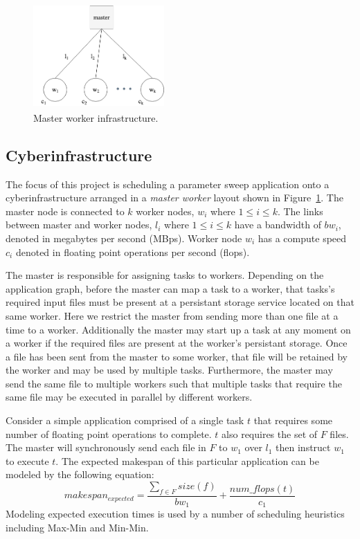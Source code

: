 \begin{figure}[H]
  \centering
  \includegraphics[width=50mm, height=40mm]{figures/platform.png}
  \caption{Master worker infrastructure.}
  \label{fig:platform}
\end{figure}

\subsection*{Cyberinfrastructure}

The focus of this project is scheduling a parameter sweep application onto a
cyberinfrastructure arranged in a \textit{master worker} layout shown in Figure~\ref{fig:platform}. The
master node is connected to $k$ worker nodes, $w_i$ where $1 \leq i \leq k$.
The links between master and worker nodes, $l_i$ where $1 \leq i \leq k$ have
a bandwidth of $bw_i$, denoted in megabytes per second (MBps).
Worker node $w_i$ has a compute speed $c_i$ denoted in floating point operations
per second (flops).

The master is responsible for assigning tasks to workers. Depending
on the application graph, before the master can map a task to a worker,
that tasks's required input files must be present at a persistant storage
service located on that same worker. Here we restrict the master from
sending more than one file at a time to a worker. Additionally the master
may start up a task at any moment on a worker if the required files are present
at the worker's persistant storage. Once a file has been sent from the master
to some worker, that file will be retained by the worker and may be used by
multiple tasks. Furthermore, the master may send the same file to multiple
workers such that multiple tasks that require the same file may be executed
in parallel by different workers.

Consider a simple application comprised of a single task $t$ that requires
some number of floating point operations to complete. $t$ also requires the set
of $F$ files. The master will synchronously send each file in $F$ to $w_1$
over $l_1$ then instruct $w_1$ to execute $t$. The expected makespan of this
particular application can be modeled by the following equation:
$$ makespan_{expected} = \frac{\sum\limits_{f \in F}size(f)}{bw_1} + \frac{num\_flops(t)} {c_1} $$
Modeling expected execution times is used by a number of scheduling heuristics
including Max-Min and Min-Min.

